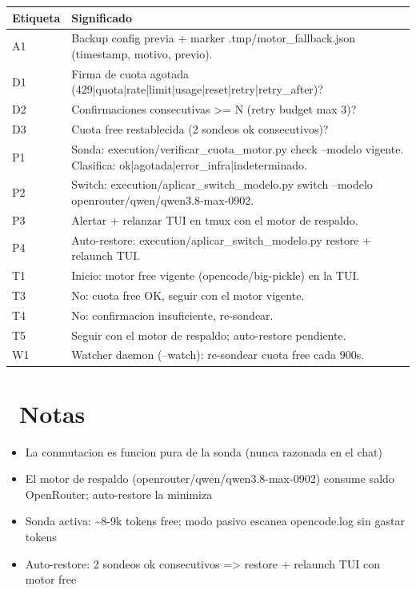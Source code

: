 \documentclass[11pt,a4paper]{article}
\newcommand{\iconotexto}[2]{\textcolor{cyanNeon}{\faIcon{#1}}~#2}
\begin{document}
\vspace{6pt}
\begin{tcolorbox}[cajaContenido, title={\faIcon{table}~Leyenda de etiquetas}]
\small
\begin{tabularx}{\linewidth}{@{}>{\centering\arraybackslash}p{1.4cm}X@{}}
\toprule
\textbf{Etiqueta} & \textbf{Significado} \\ \midrule
A1 & Backup config previa + marker .tmp/motor\_fallback.json (timestamp, motivo, previo). \\
D1 & Firma de cuota agotada (429|quota|rate|limit|usage|reset|retry|retry\_after)? \\
D2 & Confirmaciones consecutivas >= N (retry budget max 3)? \\
D3 & Cuota free restablecida (2 sondeos ok consecutivos)? \\
P1 & Sonda: execution/verificar\_cuota\_motor.py check --modelo vigente. Clasifica: ok|agotada|error\_infra|indeterminado. \\
P2 & Switch: execution/aplicar\_switch\_modelo.py switch --modelo openrouter/qwen/qwen3.8-max-0902. \\
P3 & Alertar + relanzar TUI en tmux con el motor de respaldo. \\
P4 & Auto-restore: execution/aplicar\_switch\_modelo.py restore + relaunch TUI. \\
T1 & Inicio: motor free vigente (opencode/big-pickle) en la TUI. \\
T3 & No: cuota free OK, seguir con el motor vigente. \\
T4 & No: confirmacion insuficiente, re-sondear. \\
T5 & Seguir con el motor de respaldo; auto-restore pendiente. \\
W1 & Watcher daemon (--watch): re-sondear cuota free cada 900s. \\
\bottomrule
\end{tabularx}
\end{tcolorbox}


\section{\iconotexto{sticky-note}{Notas}}
\begin{itemize}
\item La conmutacion es funcion pura de la sonda (nunca razonada en el chat)
\item El motor de respaldo (openrouter/qwen/qwen3.8-max-0902) consume saldo OpenRouter; auto-restore la minimiza
\item Sonda activa: \textasciitilde{}8-9k tokens free; modo pasivo escanea opencode.log sin gastar tokens
\item Auto-restore: 2 sondeos ok consecutivos => restore + relaunch TUI con motor free
\end{itemize}

\end{document}

